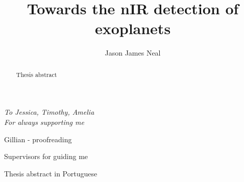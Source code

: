 \documentclass[fleqn]{fcup-thesis}
\author{Jason James Neal}
\title{Towards the nIR detection of exoplanets}
\begin{document}
	
	\begin{preliminary}
		
		\maketitle
		\cleardoublepage
		
		
		\begin{dedication}
			\centering \huge \itshape
			To Jessica, Timothy, Amelia\\For always supporting me
		\end{dedication}
		
		
		\begin{acknowledgements}
			
			Gillian - proofreading
			
			Supervisors for guiding me
			
			\vspace{7mm}
			
			
		\end{acknowledgements}
		
		
		
		\begin{abstract}
			
			Thesis abstract
		\end{abstract}
		
		\begin{abstract-pt}
			
			Thesis abstract in Portuguese
		\end{abstract-pt}
		
		
        \todototoc
		\listoftodos
        
		\tableofcontents
		\listoftables
		\listoffigures
        
       
        
        
		\begin{abbreviations}		
			\begin{longtable}{ll}
				

\end{longtable}
\end{abbreviations}
\end{preliminary}
\end{document}
